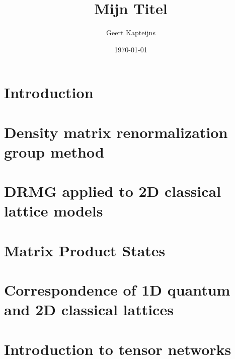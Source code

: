 \documentclass[9pt, ebook, openany, oneside]{memoir}
\begin{document}
\pagestyle{simple}



\frontmatter

\title{Mijn Titel}
\author{Geert Kapteijns}
\date{\today}


\tableofcontents

\mainmatter

\chapter{Introduction}


%

\chapter{Density matrix renormalization group method}


\chapter{DRMG applied to 2D classical lattice models}


\chapter{Matrix Product States}



\appendix
\chapter{Correspondence of 1D quantum and 2D classical lattices}


\chapter{Introduction to tensor networks}



\backmatter
\printbibliography
\end{document}
